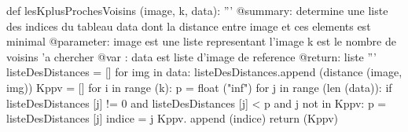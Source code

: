 \documentclass[10pt,lang=french]{scrartcl}
\begin{document}
\begin{python}
def lesKplusProchesVoisins (image, k, data):
    '''
    @summary:   determine une liste des indices du tableau data dont la distance entre image et ces elements est minimal
    @parameter: image est une liste representant l'image
    k est le nombre de voisins 'a chercher
    @var :      data est liste d'image de reference
    @return:    liste
    '''
    listeDesDistances = []
    for img in data:
        listeDesDistances.append (distance (image, img))
    Kppv = []
    for i in range (k):
        p = float ("inf")
        for j in range (len (data)):
            if listeDesDistances [j] != 0 and listeDesDistances [j] < p and j not in Kppv:
                p = listeDesDistances [j]
                indice = j
            Kppv. append (indice)
    return (Kppv)  
\end{python}
    
\end{document}
